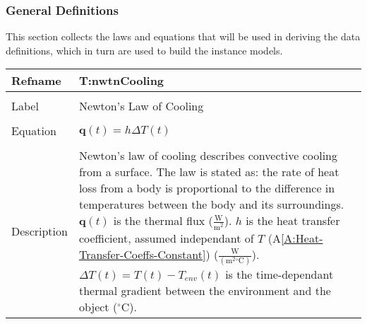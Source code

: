 \documentclass[12pt]{article}
\begin{document}
\subsubsection{General Definitions}
\label{Sec:GDs}
This section collects the laws and equations that will be used in deriving the data definitions, which in turn are used to build the instance models.
~\newline
\noindent \begin{minipage}{\textwidth}
\begin{tabular}{p{} p{}}
\toprule \textbf{Refname} & \textbf{T:nwtnCooling}
\label{T:nwtnCooling}
\\ \midrule \\
Label & Newton's Law of Cooling
\\ \midrule \\
Equation & $\mathbf{q}\left(t\right)=h ΔT\left(t\right)$
\\ \midrule \\
Description & Newton's law of cooling describes convective cooling from a surface. The law is stated as: the rate of heat loss from a body is proportional to the difference in temperatures between the body and its surroundings. $\mathbf{q}\left(t\right)$ is the thermal flux ($\frac{\text{W}}{\text{m}^{2}}$). $h$ is the heat transfer coefficient, assumed independant of $T$ (A\ref{A:Heat-Transfer-Coeffs-Constant}) ($\frac{\text{W}}{(\text{m}^{2}{}^{\circ}\text{C})}$). $ΔT\left(t\right)=T\left(t\right)-{T_{env}}\left(t\right)$ is the time-dependant thermal gradient between the environment and the object (${}^{\circ}$C).
\\ \bottomrule \end{tabular}
\end{minipage}\\
~\newline
\end{document}
